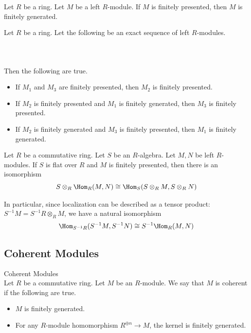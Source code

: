 \documentclass[a4paper]{article}
\begin{document}
\begin{lmm}{}{} Let $R$ be a ring. Let $M$ be a left $R$-module. If $M$ is finitely presented, then $M$ is finitely generated. 
\end{lmm}

\begin{prp}{}{} Let $R$ be a ring. Let the following be an exact sequence of left $R$-modules. \\~\\
\\~\\
Then the following are true. 
\begin{itemize}
\item If $M_1$ and $M_3$ are finitely presented, then $M_2$ is finitely presented. 
\item If $M_2$ is finitely presented and $M_1$ is finitely generated, then $M_3$ is finitely presented. 
\item If $M_2$ is finitely generated and $M_3$ is finitely presented, then $M_1$ is finitely generated. 
\end{itemize}
\end{prp}

\begin{prp}{}{} Let $R$ be a commutative ring. Let $S$ be an $R$-algebra. Let $M,N$ be left $R$-modules. If $S$ is flat over $R$ and $M$ is finitely presented, then there is an isomorphism $$S\otimes_R\Hom_R(M,N)\cong\Hom_S(S\otimes_RM,S\otimes_RN)$$
\end{prp}

In particular, since localization can be described as a tensor product: $S^{-1}M=S^{-1}R\otimes_RM$, we have a natural isomorphism $$\Hom_{S^{-1}R}(S^{-1}M,S^{-1}N)\cong S^{-1}\Hom_R(M,N)$$

\subsection{Coherent Modules}
\begin{defn}{Coherent Modules}{}\\
Let $R$ be a commutative ring. Let $M$ be an $R$-module. We say that $M$ is coherent if the following are true. 
\begin{itemize}
\item $M$ is finitely generated. 
\item For any $R$-module homomorphism $R^{\oplus n}\to M$, the kernel is finitely generated. 
\end{itemize}
\end{defn}
\end{document}
